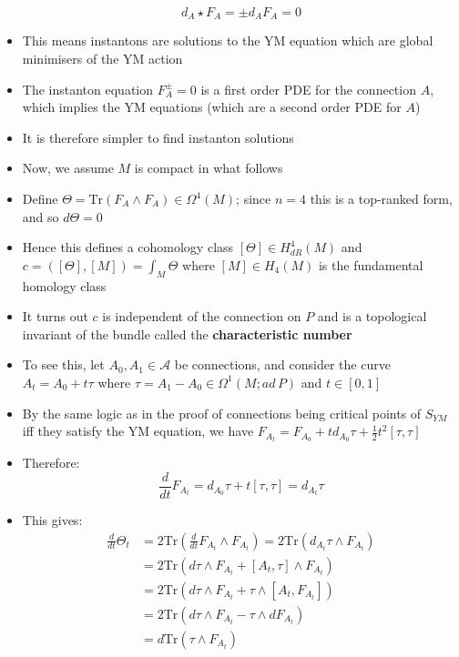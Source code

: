 \documentclass[12pt,a4paper]{article}
\numberwithin{equation}{section}
\begin{document}
\begin{itemize}
		\begin{equation}
			d_{A}\star F_{A}=\pm d_{A}F_{A}=0
		\end{equation}
		\item This means instantons are solutions to the YM equation which are global minimisers of the YM action
		\item The instanton equation $F_{A}^{\pm}=0$ is a first order PDE for the connection $A$, which implies the YM equations (which are a second order PDE for $A$)
		\item It is therefore simpler to find instanton solutions
		\item Now, we assume $M$ is compact in what follows
		\item Define $\Theta=\text{Tr}(F_{A}\wedge F_{A})\in\Omega^{4}(M)$; since $n=4$ this is a top-ranked form, and so $d\Theta=0$
		\item Hence this defines a cohomology class $[\Theta]\in H_{dR}^{4}(M)$ and $c=([\Theta],[M])=\int_{M}\Theta$ where $[M]\in H_{4}(M)$ is the fundamental homology class
		\item It turns out $c$ is independent of the connection on $P$ and is a topological invariant of the bundle called the \textbf{characteristic number}
		\item To see this, let $A_{0},A_{1}\in\mathcal{A}$ be connections, and consider the curve $A_{t}=A_{0}+t\tau$ where $\tau=A_{1}-A_{0}\in\Omega^{1}(M;ad\,P)$ and $t\in [0,1]$
		\item By the same logic as in the proof of connections being critical points of $S_{YM}$ iff they satisfy the YM equation, we have $F_{A_{t}}=F_{A_{0}}+td_{A_{0}}\tau+\frac{1}{2}t^{2}[\tau,\tau]$
		\item Therefore:
		\begin{equation}
			\frac{d}{dt}F_{A_{t}}=d_{A_{0}}\tau+t[\tau,\tau]=d_{A_{t}}\tau
		\end{equation}
		\item This gives:
		\begin{equation}
			\begin{aligned}
				\frac{d}{dt}\Theta_{t}&=2\text{Tr}\left(\frac{d}{dt}F_{A_{t}}\wedge F_{A_{t}}\right)=2\text{Tr}(d_{A_{t}}\tau\wedge F_{A_{t}})\\&=2\text{Tr}(d\tau\wedge F_{A_{t}}+[A_{t},\tau]\wedge F_{A_{t}})\\&=2\text{Tr}(d\tau\wedge F_{A_{t}}+\tau\wedge[A_{t},F_{A_{t}}])\\&=2\text{Tr}(d\tau\wedge F_{A_{t}}-\tau\wedge dF_{A_{t}})\\&=d\text{Tr}(\tau\wedge F_{A_{t}})

\end{aligned}
\end{equation}
\end{itemize}
\end{document}
